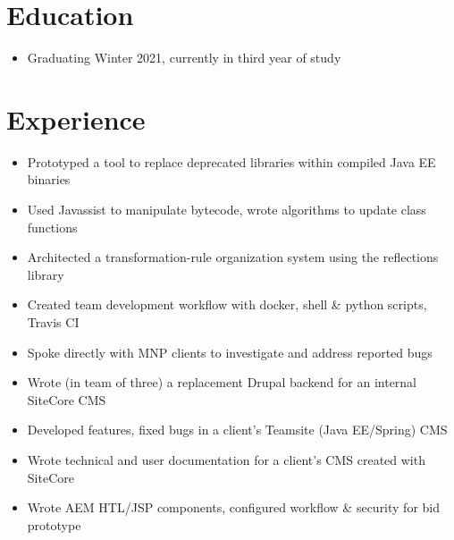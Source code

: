 \documentclass[]{rcf_cv}
\begin{document}
	
	
	
	\section{Education}
	
		\begin{itemize}
			\setlength\itemsep{-0.4em}
			\renewcommand\labelitemi{--}
			
			\item Graduating Winter 2021, currently in third year of study
			
		\end{itemize}
	
	\section{Experience}
	
		\begin{itemize}
			\setlength\itemsep{-0.4em}
			\renewcommand\labelitemi{--}
			
			\item Prototyped a tool to replace deprecated libraries within compiled Java EE binaries
			\item Used Javassist to manipulate bytecode, wrote algorithms to update class functions
			\item Architected a transformation-rule organization system using the reflections library
			\item Created team development workflow with docker, shell \& python scripts, Travis CI

		\end{itemize}
	
		\begin{itemize}
			\setlength\itemsep{-0.4em}
			\renewcommand\labelitemi{--}
			
			\item Spoke directly with MNP clients to investigate and address reported bugs
			\item Wrote (in team of three) a replacement Drupal backend for an internal SiteCore CMS
			\item Developed features, fixed bugs in a client's Teamsite (Java EE/Spring) CMS
			\item Wrote technical and user documentation for a client's CMS created with SiteCore 
			\item Wrote AEM HTL/JSP components, configured workflow \& security for bid prototype

			
		\end{itemize}
	
\end{document}
